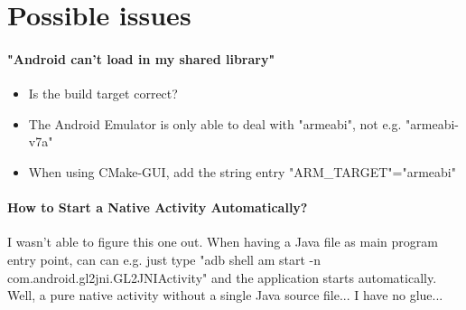 \section{Possible issues}


\paragraph{"Android can't load in my shared library"}
\begin{itemize}
\item{Is the build target correct?}
\item{The Android Emulator is only able to deal with "armeabi", not e.g. "armeabi-v7a"}
\item{\textrightarrow{} When using CMake-\ac{GUI}, add the string entry "ARM\_TARGET"="armeabi"}
\end{itemize}


\paragraph{How to Start a Native Activity Automatically?}
I wasn't able to figure this one out. When having a Java file as main program entry point, can can e.g. just type "adb shell am start -n com.android.gl2jni.GL2JNIActivity" and the application starts automatically. Well, a pure native activity without a single Java source file... I have no glue...
